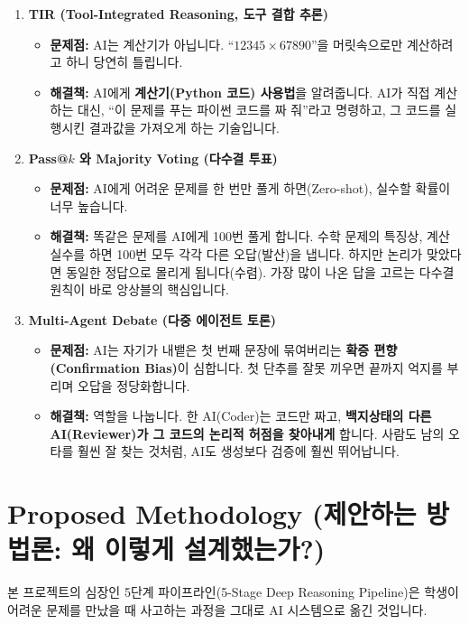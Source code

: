 \documentclass[11pt,a4paper]{article}
\begin{document}
\begin{enumerate}
    \item \textbf{TIR (Tool-Integrated Reasoning, 도구 결합 추론)}
    \begin{itemize}
        \item \textbf{문제점:} AI는 계산기가 아닙니다. ``$12345 \times 67890$''을 머릿속으로만 계산하려고 하니 당연히 틀립니다.
        \item \textbf{해결책:} AI에게 \textbf{계산기(Python 코드) 사용법}을 알려줍니다. AI가 직접 계산하는 대신, ``이 문제를 푸는 파이썬 코드를 짜 줘''라고 명령하고, 그 코드를 실행시킨 결과값을 가져오게 하는 기술입니다.
    \end{itemize}
    
    \item \textbf{Pass@$k$ 와 Majority Voting (다수결 투표)}
    \begin{itemize}
        \item \textbf{문제점:} AI에게 어려운 문제를 한 번만 풀게 하면(Zero-shot), 실수할 확률이 너무 높습니다.
        \item \textbf{해결책:} 똑같은 문제를 AI에게 100번 풀게 합니다. 수학 문제의 특징상, 계산 실수를 하면 100번 모두 각각 다른 오답(발산)을 냅니다. 하지만 논리가 맞았다면 동일한 정답으로 몰리게 됩니다(수렴). 가장 많이 나온 답을 고르는 다수결 원칙이 바로 앙상블의 핵심입니다.
    \end{itemize}
    
    \item \textbf{Multi-Agent Debate (다중 에이전트 토론)}
    \begin{itemize}
        \item \textbf{문제점:} AI는 자기가 내뱉은 첫 번째 문장에 묶여버리는 \textbf{확증 편향(Confirmation Bias)}이 심합니다. 첫 단추를 잘못 끼우면 끝까지 억지를 부리며 오답을 정당화합니다.
        \item \textbf{해결책:} 역할을 나눕니다. 한 AI(Coder)는 코드만 짜고, \textbf{백지상태의 다른 AI(Reviewer)가 그 코드의 논리적 허점을 찾아내게} 합니다. 사람도 남의 오타를 훨씬 잘 찾는 것처럼, AI도 생성보다 검증에 훨씬 뛰어납니다.
    \end{itemize}
\end{enumerate}

\section{Proposed Methodology (제안하는 방법론: 왜 이렇게 설계했는가?)}
본 프로젝트의 심장인 5단계 파이프라인(5-Stage Deep Reasoning Pipeline)은 학생이 어려운 문제를 만났을 때 사고하는 과정을 그대로 AI 시스템으로 옮긴 것입니다.
\end{document}

